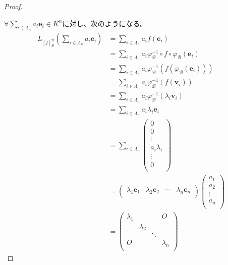\documentclass[dvipdfmx]{jsarticle}
\begin{document}
\begin{proof}
\begin{center}
\begin{tikzpicture}[auto]
  \end{tikzpicture} 
\end{center}
$\forall\sum_{i \in \varLambda_{n}} {a_{i}\mathbf{e}_{i}} \in K^{n}$に対し、次のようになる。
\begin{align*}
L_{[ f]_{\mathcal{B}}^{\mathcal{B}}}\left( \sum_{i \in \varLambda_{n}} {a_{i}\mathbf{e}_{i}} \right) &= \sum_{i \in \varLambda_{n}} {a_{i}f\left( \mathbf{e}_{i} \right)}\\
&= \sum_{i \in \varLambda_{n}} {a_{i}\varphi_{\mathcal{B}}^{- 1} \circ f \circ \varphi_{\mathcal{B}}\left( \mathbf{e}_{i} \right)}\\
&= \sum_{i \in \varLambda_{n}} {a_{i}\varphi_{\mathcal{B}}^{- 1}\left( f\left( \varphi_{\mathcal{B}}\left( \mathbf{e}_{i} \right) \right) \right)}\\
&= \sum_{i \in \varLambda_{n}} {a_{i}\varphi_{\mathcal{B}}^{- 1}\left( f\left( \mathbf{v}_{i} \right) \right)}\\
&= \sum_{i \in \varLambda_{n}} {a_{i}\varphi_{\mathcal{B}}^{- 1}\left( \lambda_{i}\mathbf{v}_{i} \right)}\\
&= \sum_{i \in \varLambda_{n}} {a_{i}\lambda_{i}\mathbf{e}_{i}}\\
&= \sum_{i \in \varLambda_{n}} \begin{pmatrix}
0 \\
0 \\
 \vdots \\
a_{i}\lambda_{i} \\
 \vdots \\
0 \\
\end{pmatrix}\\
&= \begin{pmatrix}
\lambda_{1}\mathbf{e}_{1} & \lambda_{2}\mathbf{e}_{2} & \cdots & \lambda_{n}\mathbf{e}_{n} \\
\end{pmatrix}\begin{pmatrix}
a_{1} \\
a_{2} \\
 \vdots \\
a_{n} \\
\end{pmatrix}\\
&= \begin{pmatrix}
\lambda_{1} & \  & \  & O \\
\  & \lambda_{2} & \  & \  \\
\  & \  & \ddots & \  \\
O & \  & \  & \lambda_{n} \\

\end{pmatrix}
\end{align*}
\end{proof}
\end{document}
